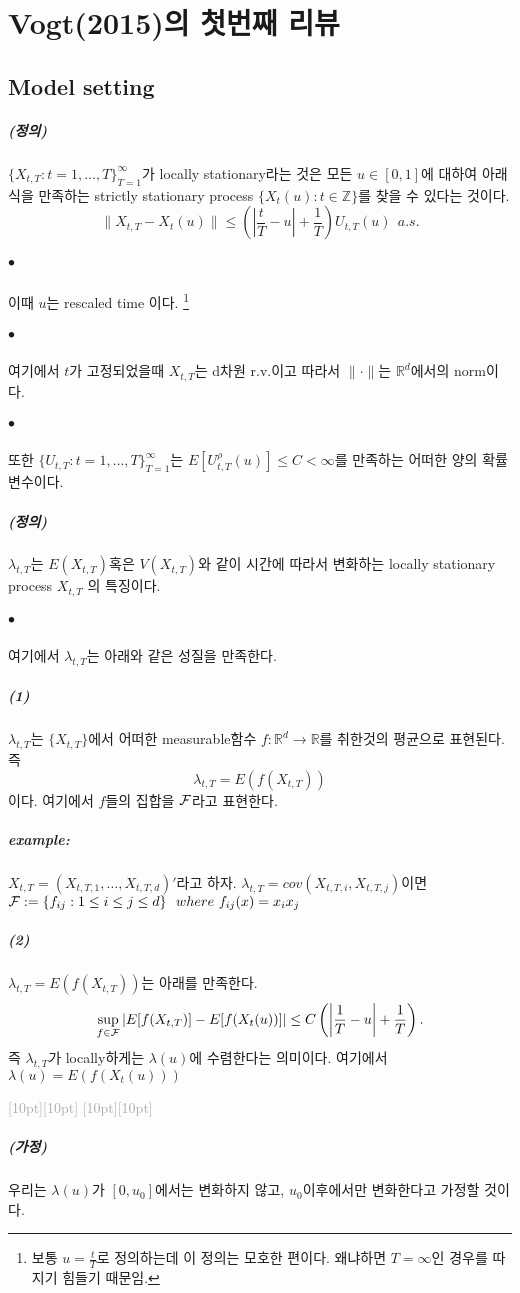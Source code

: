 \documentclass[12pt,oneside,english]{book}
\newcommand{\rdash}{\noindent \textcolor{darkgray}{ \raisebox{-1.9pt}[10pt][10pt]{\leafright} \hrulefill \raisebox{-1.9pt}[10pt][10pt]{\leafright \decofourleft \decothreeleft  \aldineright \decotwo \floweroneleft \decoone}}}
\def\ck{\paragraph{\large$\bullet$}\large}
\def\assume{\paragraph{\large(가정)}\large}
\def\dfn{\paragraph{\large(정의)}\large}
\def\ex{\paragraph{\large\textit{example:}}\large}
\def\one{\paragraph{\large(1)}\large}
\def\two{\paragraph{\large(2)}\large}
\begin{document}

\chapter{Vogt(2015)의 첫번째 리뷰}
\section{Model setting}
\dfn 
$\{X_{t,T}:t=1,\dots,T\}_{T=1}^{\infty}$가 locally stationary라는 것은 모든 $u \in [0,1]$에 대하여 아래식을 만족하는 strictly stationary process $\{X_t(u):t \in \mathbb{Z}\}$를 찾을 수 있다는 것이다.
\[
\|X_{t,T}-X_t(u)\|\leq \left(\left| \frac{t}{T}-u \right|+\frac{1}{T} \right)U_{t,T}(u)~~a.s.
\]

\ck 이때 $u$는 rescaled time 이다. \footnote{보통 $u=\frac{t}{T}$로 정의하는데 이 정의는 모호한 편이다. 왜냐하면 $T=\infty$인 경우를 따지기 힘들기 때문임.}

\ck 여기에서 $t$가 고정되었을때 $X_{t,T}$는 d차원 r.v.이고 따라서 $\| \cdot \|$는 $\mathbb{R}^d$에서의 norm이다. 

\ck 또한 $\{U_{t,T}:t=1,\dots,T\}_{T=1}^{\infty}$는 $E[U_{t,T}^{\rho}(u)] \leq C < \infty$를 만족하는 어떠한 양의 확률변수이다. 

\dfn 
$\lambda_{t,T}$는 $E(X_{t,T})$혹은 $V(X_{t,T})$와 같이 시간에 따라서 변화하는 locally stationary process $X_{t,T}$ 의 특징이다. 

\ck 여기에서 $\lambda_{t,T}$는 아래와 같은 성질을 만족한다. 

\one $\lambda_{t,T}$는 $\{X_{t,T}\}$에서 어떠한 measurable함수 $f:\mathbb{R}^d \rightarrow \mathbb{R}$를 취한것의 평균으로 표현된다. 즉 $$\lambda_{t,T}=E(f(X_{t,T}))$$이다. 여기에서 $f$들의 집합을 $\cal F$라고 표현한다. 	

\ex $X_{t,T}=(X_{t,T,1},\dots,X_{t,T,d})'$라고 하자. $\lambda_{t,T}=cov(X_{t,T,i},X_{t,T,j})$이면 ${\cal F}:=\{f_{ij}:1\leq i \leq j \leq d\} ~~ where~f_{ij}(x)=x_ix_j$

\two $\lambda_{t,T}=E(f(X_{t,T}))$는 아래를 만족한다. $$\sup_{f\in {\cal F}} \left|E[f(X_{t,T})]-E[f(X_t(u))]\right| \leq C \left(\left| \frac{1}{T}-u \right|+\frac{1}{T} \right).$$ 즉 $\lambda_{t,T}$가 locally하게는 $\lambda(u)$에 수렴한다는 의미이다. 여기에서 $\lambda(u)=E(f(X_t(u)))$

\rdash

\assume 우리는 $\lambda(u)$가 $[0,u_0]$에서는 변화하지 않고, $u_0$이후에서만 변화한다고 가정할 것이다. 
\end{document}

